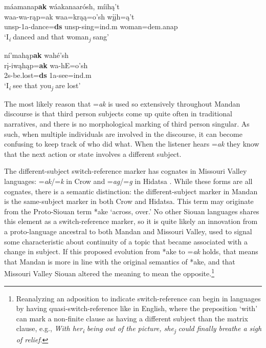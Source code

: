 \begin{exe}
\begin{xlist}
	\item\label{DSmarking3}
	\glll máamanap\textbf{ak} wáakanaarósh, míihą't\\
	waa-wa-rąp=ak waa=krąą=o'sh wįįh=ą't\\
	unsp-1a-\textnormal{dance}=\textbf{ds} unsp-\textnormal{sing}=ind.m \textnormal{woman}=dem.anap\\
	\glt `I\textsubscript{\textit{i}} danced and that woman\textsubscript{\textit{j}} sang' \citep[224]{mixco1997b}

	\item\label{DSmarking4}
	\glll ní'mahąp\textbf{ak} wahé'sh\\
	rį-iwąhąp=\textbf{ak} wa-hE=o'sh\\
	2s-\textnormal{be.lost}=\textbf{ds} 1a-\textnormal{see}=ind.m\\
	\glt `I\textsubscript{\textit{i}} see that you\textsubscript{\textit{j}} are lost' \citep[233]{mixco1997b}
	
	\end{xlist}

\end{exe}

The most likely reason that =\textit{ak} is used so extensively throughout Mandan discourse is that third person subjects come up quite often in traditional narratives, and there is no morphological marking of third person singular. As such, when multiple individuals are involved in the discourse, it can become confusing to keep track of who did what. When the listener hears =\textit{ak} they know that the next action or state involves a different subject.

The different-subject switch-reference marker has cognates in Missouri Valley languages: =\textit{ak}/=\textit{k} in Crow \citep{graczyk2007} and =\textit{ag}/=\textit{g} in Hidatsa \citep{boyle2007}. While these forms are all cognates, there is a semantic distinction: the different-subject marker in Mandan is the same-subject marker in both Crow and Hidatsa. This term may originate from the Proto-Siouan term *ake `across, over.' No other Siouan languages shares this element as a switch-reference marker, so it is quite likely an innovation from a proto-language ancestral to both Mandan and Missouri Valley, used to signal some characteristic about continuity of a topic that became associated with a change in subject. If this proposed evolution from *ake to =\textit{ak} holds, that means that Mandan is more in line with the original semantics of *ake, and that Missouri Valley Siouan altered the meaning to mean the opposite.\footnote{Reanalyzing an adposition to indicate switch-reference can begin in languages by having quasi-switch-reference like in English, where the preposition `with' can mark a non-finite clause as having a different subject than the matrix clause, e.g., \textit{With her\textsubscript{\textit{i}} being out of the picture, she\textsubscript{\textit{j}} could finally breathe a sigh of relief}.}

